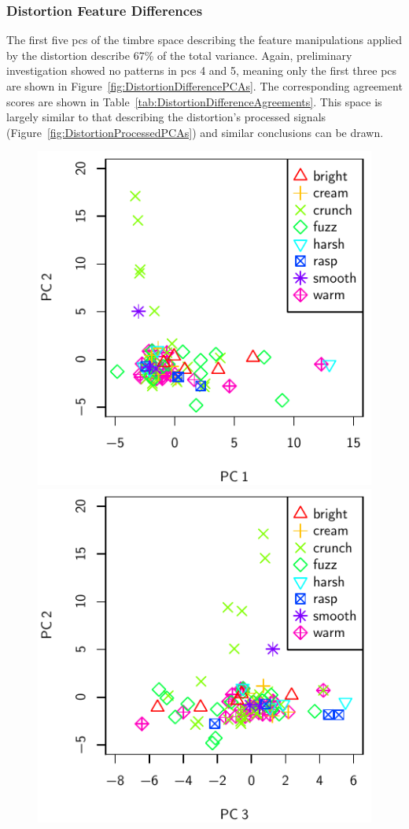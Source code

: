 		\subsubsection*{Distortion Feature Differences}
			The first five \acrshort{pc}s of the timbre space describing the feature manipulations applied by
			the distortion describe 67\% of the total variance. Again, preliminary investigation showed no
			patterns in \acrshort{pc}s 4 and 5, meaning only the first three \acrshort{pc}s are shown in
			Figure~\ref{fig:DistortionDifferencePCAs}. The corresponding agreement scores are shown in
			Table~\ref{tab:DistortionDifferenceAgreements}. This space is largely similar to that describing
			the distortion's processed signals (Figure~\ref{fig:DistortionProcessedPCAs}) and similar
			conclusions can be drawn.

			\begin{figure}[h!]
				\centering
				\subfloat
				{
					\includegraphics{chapter4/Images/DistortionDifferencePCA1-2.pdf}
					\label{fig:DistortionDifferencePCA1-2}
				}
				\quad
				\subfloat
				{
					\includegraphics{chapter4/Images/DistortionDifferencePCA3-2.pdf}
}
\end{figure}
